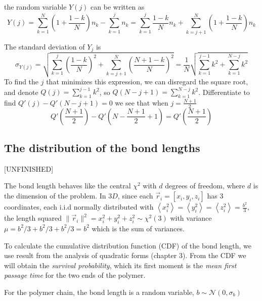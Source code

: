 \documentclass{paper}
\begin{document}
the random variable $Y(j)$ can be written as
\begin{equation*}
Y(j) = \sum_{k=1}^{N}\left(1+\frac{1-k}{N}\right)n_k -\sum_{k=1}^{j}n_k = \sum_{k=1}^{j}\frac{1-k}{N}n_k +\sum_{k=j+1}^{N}(1+\frac{1-k}{N})n_k
\end{equation*}

The standard deviation of $Y_j$ is
\begin{equation*}
\sigma_{Y(j)}=\sqrt{\sum_{k=1}^{j}\left(\frac{1-k}{N}\right)^2+\sum_{k=j+1}^{N}\left(\frac{N+1-k}{N} \right)^2}=\frac{1}{N}\sqrt{\sum_{k=1}^{j-1}k^2+\sum_{k=1}^{N-j}k^2}
\end{equation*}
To find the $j$ that minimizes this expression, we can disregard the square root, and denote $Q(j)=\sum_{k=1}^{j-1}k^2$, so $Q(N-j+1)=\sum_{k=1}^{N-j}k^2$. Differentiate to find $Q'(j)-Q'(N-j+1)=0$  we see that when $j= \frac{N+1}{2}$\\
\begin{equation*}
Q'(\frac{N+1}{2})-Q'(N-\frac{N+1}{2}+1)=Q'(\frac{N+1}{2})
\end{equation*} 




\subsection{The distribution of the bond lengths}\label{subsection_distributionOfTheBondLength}
[UNFINISHED] 

The bond length behaves like the central $\chi ^2$ with $d$ degrees of freedom, where $d$ is the dimension of the problem. 
In $3D$, since each $\vec{r}_i=[x_i,y_i,z_i]$ has 3 coordinates, each i.i.d normally distributed with $\left<x_i^2\right>=\left<y_i^2\right>=\left<z_i^2\right>=\frac{b^2}{3}$, the length squared $\|\vec{r}_i\|^2=x_i^2+y_i^2+z_i^2\sim\chi^2(3)$ 
with variance $\mu=b^2/3+b^2/3+b^2/3=b^2$ which is the sum of variances.

To calculate the cumulative distribution function (CDF) of the bond length, we use result from the analysis of quadratic forms \cite{mathai1992quadratic} (chapter 3). From the CDF we will obtain the \textit{survival probability}, which its first moment is the \textit{mean first passage time} for the two ends of the polymer.

For the polymer chain, the bond length is a random variable, $b\sim \mathcal{N}(0,\sigma_b)$
\end{document}
